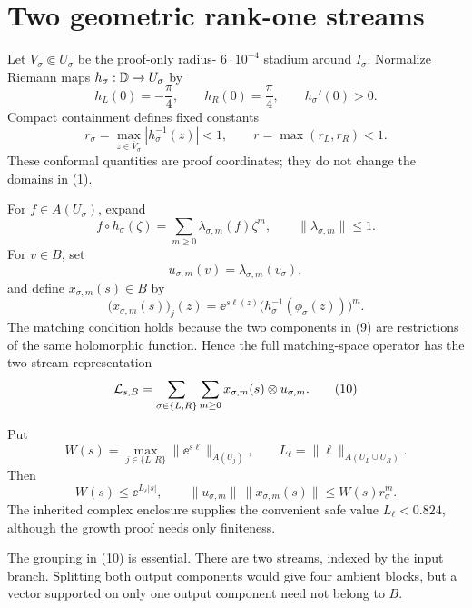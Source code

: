 \section{Two geometric rank-one streams}
Let \(V_\sigma\Subset U_\sigma\) be the proof-only radius-
\(6\cdot10^{-4}\) stadium around \(I_\sigma\). Normalize Riemann maps
\(h_\sigma:\mathbb{D}\to U_\sigma\) by
\[
 h_L(0)=-\frac\pi4,
 \qquad h_R(0)=\frac\pi4,
 \qquad h_\sigma'(0)>0.
\]
Compact containment defines fixed constants
\[
 r_\sigma=\max_{z\in\overline V_\sigma}
 |h_\sigma^{-1}(z)|<1,
 \qquad r=\max(r_L,r_R)<1.
 \tag{7}
\]
These conformal quantities are proof coordinates; they do not change the
domains in (1).

For \(f\in A(U_\sigma)\), expand
\[
 f\circ h_\sigma(\zeta)
 =\sum_{m\ge0}\lambda_{\sigma,m}(f)\zeta^m,
 \qquad \|\lambda_{\sigma,m}\|\le1.
 \tag{8}
\]
For \(v\in B\), set
\[
 u_{\sigma,m}(v)=\lambda_{\sigma,m}(v_\sigma),
\]
and define \(x_{\sigma,m}(s)\in B\) by
\[
 \bigl(x_{\sigma,m}(s)\bigr)_j(z)
 =\ee^{s\ell(z)}
 \bigl(h_\sigma^{-1}(\phi_\sigma(z))\bigr)^m.
 \tag{9}
\]
The matching condition holds because the two components in (9) are
restrictions of the same holomorphic function. Hence the full matching-space
operator has the two-stream representation
\[
 \mathcal{L}_{s,B}
 =\sum_{\sigma\in\{L,R\}}\sum_{m\ge0}
 x_{\sigma,m}(s)\otimes u_{\sigma,m}.
 \tag{10}
\]

Put
\[
 W(s)=\max_{j\in\{L,R\}}
 \|\ee^{s\ell}\|_{A(U_j)},
 \qquad L_\ell=\|\ell\|_{A(U_L\cup U_R)}.
\]
Then
\[
 W(s)\le\ee^{L_\ell|s|},
 \qquad
 \|u_{\sigma,m}\|\,\|x_{\sigma,m}(s)\|
 \le W(s)r_\sigma^m.
 \tag{11}
\]
The inherited complex enclosure supplies the convenient safe value
\(L_\ell<0.824\), although the growth proof needs only finiteness.

The grouping in (10) is essential. There are two streams, indexed by the
input branch. Splitting both output components would give four ambient
blocks, but a vector supported on only one output component need not belong
to \(B\).

